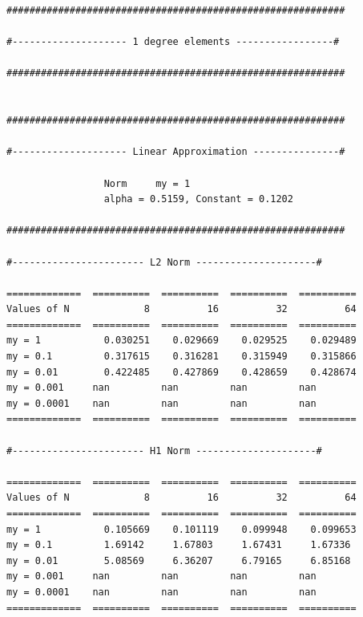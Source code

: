 \documentclass[a4paper,norsk]{article}
\begin{document}
\newpage
\begin{lstlisting}[style=terminal]
###########################################################

#-------------------- 1 degree elements -----------------#

###########################################################


###########################################################

#-------------------- Linear Approximation ---------------#

                 Norm     my = 1
                 alpha = 0.5159, Constant = 0.1202

###########################################################

#----------------------- L2 Norm ---------------------#

=============  ==========  ==========  ==========  ==========
Values of N             8          16          32          64
=============  ==========  ==========  ==========  ==========
my = 1           0.030251    0.029669    0.029525    0.029489
my = 0.1         0.317615    0.316281    0.315949    0.315866
my = 0.01        0.422485    0.427869    0.428659    0.428674
my = 0.001     nan         nan         nan         nan
my = 0.0001    nan         nan         nan         nan
=============  ==========  ==========  ==========  ==========

#----------------------- H1 Norm ---------------------#

=============  ==========  ==========  ==========  ==========
Values of N             8          16          32          64
=============  ==========  ==========  ==========  ==========
my = 1           0.105669    0.101119    0.099948    0.099653
my = 0.1         1.69142     1.67803     1.67431     1.67336
my = 0.01        5.08569     6.36207     6.79165     6.85168
my = 0.001     nan         nan         nan         nan
my = 0.0001    nan         nan         nan         nan
=============  ==========  ==========  ==========  ==========
\end{lstlisting}
\newpage
\end{document}
